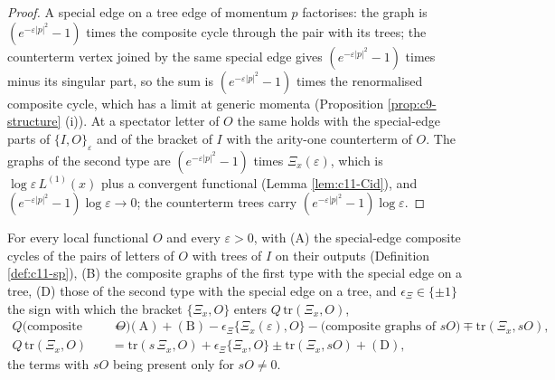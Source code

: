 \begin{proof}
A special edge on a tree edge of momentum $p$ factorises: the graph is $(e^{-\varepsilon|p|^2}-1)$ times the composite cycle through the pair with its trees; the counterterm vertex joined by the same special edge gives $(e^{-\varepsilon|p|^2}-1)$ times minus its singular part, so the sum is $(e^{-\varepsilon|p|^2}-1)$ times the renormalised composite cycle, which has a limit at generic momenta (Proposition \ref{prop:c9-structure} (i)). At a spectator letter of $O$ the same holds with the special-edge parts of $\{I,O\}_\varepsilon$ and of the bracket of $I$ with the arity-one counterterm of $O$. The graphs of the second type are $(e^{-\varepsilon|p|^2}-1)$ times $\Xi_x(\varepsilon)$, which is $\log\varepsilon\,L^{(1)}(x)$ plus a convergent functional (Lemma \ref{lem:c11-Cid}), and $(e^{-\varepsilon|p|^2}-1)\log\varepsilon\to0$; the counterterm trees carry $(e^{-\varepsilon|p|^2}-1)\log\varepsilon$.
\end{proof}

\begin{proposition}
\label{prop:c11-typeI}
For every local functional $O$ and every $\varepsilon>0$, with (A) the special-edge composite cycles of the pairs of letters of $O$ with trees of $I$ on their outputs (Definition \ref{def:c11-sp}), (B) the composite graphs of the first type with the special edge on a tree, (D) those of the second type with the special edge on a tree, and $\epsilon_\Xi\in\{\pm1\}$ the sign with which the bracket $\{\Xi_x,O\}$ enters $Q\,\mathrm{tr}(\Xi_x,O)$,
\[
\begin{aligned}
Q\big(\text{composite graphs of the first type of }O\big)&=(\mathrm A)+(\mathrm B)-\epsilon_\Xi\{\Xi_x(\varepsilon),O\}-\big(\text{composite graphs of }sO\big)\mp\mathrm{tr}(\Xi_x,sO),\\
Q\,\mathrm{tr}(\Xi_x,O)&=\mathrm{tr}(s\,\Xi_x,O)+\epsilon_\Xi\{\Xi_x,O\}\pm\mathrm{tr}(\Xi_x,sO)+(\mathrm D),
\end{aligned}
\]
the terms with $sO$ being present only for $sO\neq0$.
\end{proposition}

